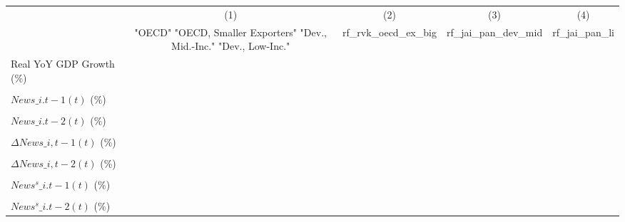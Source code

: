 {
\def\sym#1{\ifmmode^{#1}\else\(^{#1}\)\fi}
\begin{tabular}{l*{4}{c}}
\toprule
                    &\multicolumn{1}{c}{(1)}&\multicolumn{1}{c}{(2)}&\multicolumn{1}{c}{(3)}&\multicolumn{1}{c}{(4)}\\
                    &\multicolumn{1}{c}{ "OECD" "OECD, Smaller Exporters" "Dev., Mid.-Inc." "Dev., Low-Inc."}&\multicolumn{1}{c}{rf\_rvk\_oecd\_ex\_big}&\multicolumn{1}{c}{rf\_jai\_pan\_dev\_mid}&\multicolumn{1}{c}{rf\_jai\_pan\_li}\\
\midrule
Real YoY GDP Growth (\%)&                     &                     &                     &                     \\
                    &                     &                     &                     &                     \\
\addlinespace
$ News\_{i.t-1}(t)$ (\%)&                     &                     &                     &                     \\
                    &                     &                     &                     &                     \\
\addlinespace
$ News\_{i.t-2}(t)$ (\%)&                     &                     &                     &                     \\
                    &                     &                     &                     &                     \\
\addlinespace
$ \Delta News\_{i,t-1}(t)$ (\%)&                     &                     &                     &                     \\
                    &                     &                     &                     &                     \\
\addlinespace
$ \Delta News\_{i,t-2}(t)$ (\%)&                     &                     &                     &                     \\
                    &                     &                     &                     &                     \\
\addlinespace
$ News^s\_{i.t-1}(t)$ (\%)&                     &                     &                     &                     \\
                    &                     &                     &                     &                     \\
\addlinespace
$ News^s\_{i.t-2}(t)$ (\%)&                     &                     &                     &                     \\

\end{tabular}}

